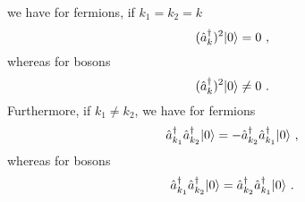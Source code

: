     we have for fermions, if $k_1 = k_2 = k$
    \begin{equation*}
    (\hat a^\dagger_k)^2 \vert0\rangle = 0 ~,
    \end{equation*}
    whereas for bosons 
    \begin{equation*}
        (\hat a^\dagger_k)^2 \vert0\rangle \neq 0 ~.
    \end{equation*}
    Furthermore, if $k_1 \neq  k_2$, we have for fermions
    \begin{equation*}
        \hat a^\dagger_{k_1} \hat a^\dagger_{k_2} \vert0\rangle = - \hat a^\dagger_{k_2} \hat a^\dagger_{k_1} \vert0\rangle ~,
    \end{equation*}
    whereas for bosons 
    \begin{equation*}
        \hat a^\dagger_{k_1} \hat a^\dagger_{k_2} \vert0\rangle = \hat a^\dagger_{k_2} \hat a^\dagger_{k_1} \vert0\rangle ~.
    \end{equation*}

